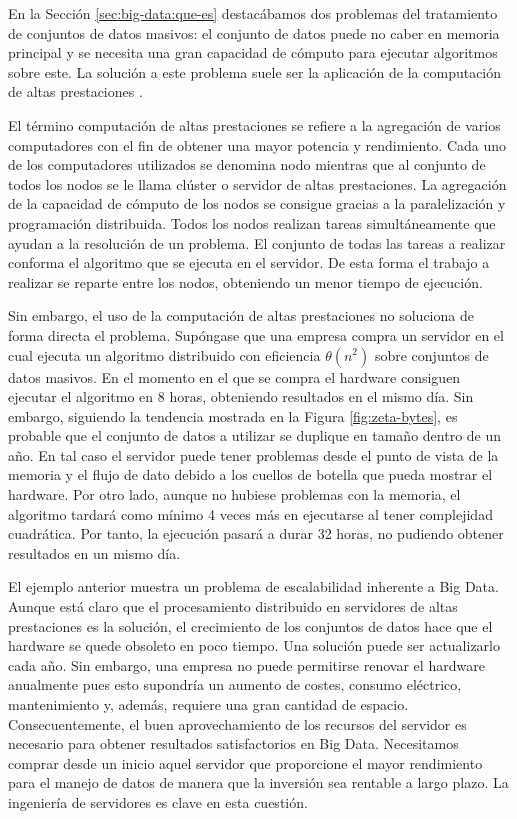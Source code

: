 \documentclass[10pt]{article}
\begin{document}
		En la Sección \ref{sec:big-data:que-es} destacábamos dos problemas del tratamiento de conjuntos de datos masivos: el conjunto de datos puede no caber en memoria principal y se necesita una gran capacidad de cómputo para ejecutar algoritmos sobre este. La solución a este problema suele ser la aplicación de la computación de altas prestaciones \cite{hpc}.
		
		El término computación de altas prestaciones se refiere a la agregación de varios computadores con el fin de obtener una mayor potencia y rendimiento. Cada uno de los computadores utilizados se denomina nodo mientras que al conjunto de todos los nodos se le llama clúster o servidor de altas prestaciones. La agregación de la capacidad de cómputo de los nodos se consigue gracias a la paralelización y programación distribuida. Todos los nodos realizan tareas simultáneamente que ayudan a la resolución de un problema. El conjunto de todas las tareas a realizar conforma el algoritmo que se ejecuta en el servidor. De esta forma el trabajo a realizar se reparte entre los nodos, obteniendo un menor tiempo de ejecución.
		
		
		Sin embargo, el uso de la computación de altas prestaciones no soluciona de forma directa el problema. Supóngase que una empresa compra un servidor en el cual ejecuta un algoritmo distribuido con eficiencia $\theta(n^2)$ sobre conjuntos de datos masivos. En el momento en el que se compra el hardware consiguen ejecutar el algoritmo en 8 horas, obteniendo resultados en el mismo día. Sin embargo, siguiendo la tendencia mostrada en la Figura \ref{fig:zeta-bytes}, es probable que el conjunto de datos a utilizar se duplique en tamaño dentro de un año. En tal caso el servidor puede tener problemas desde el punto de vista de la memoria y el flujo de dato debido a los cuellos de botella que pueda mostrar el hardware. Por otro lado, aunque no hubiese problemas con la memoria, el algoritmo tardará como mínimo 4 veces más en ejecutarse al tener complejidad cuadrática. Por tanto, la ejecución pasará a durar 32 horas, no pudiendo obtener resultados en un mismo día. 
				
		El ejemplo anterior muestra un problema de escalabilidad inherente a Big Data. Aunque está claro que el procesamiento distribuido en servidores de altas prestaciones es la solución, el crecimiento de los conjuntos de datos hace que el hardware se quede obsoleto en poco tiempo. Una solución puede ser actualizarlo cada año. Sin embargo, una empresa no puede permitirse renovar el hardware anualmente pues esto supondría un aumento de costes, consumo eléctrico, mantenimiento y, además, requiere una gran cantidad de espacio. Consecuentemente, el buen aprovechamiento de los recursos del servidor es necesario para obtener resultados satisfactorios en Big Data. Necesitamos comprar desde un inicio aquel servidor que proporcione el mayor rendimiento para el manejo de datos de manera que la inversión sea rentable a largo plazo. La ingeniería de servidores es clave en esta cuestión.
		
\end{document}
